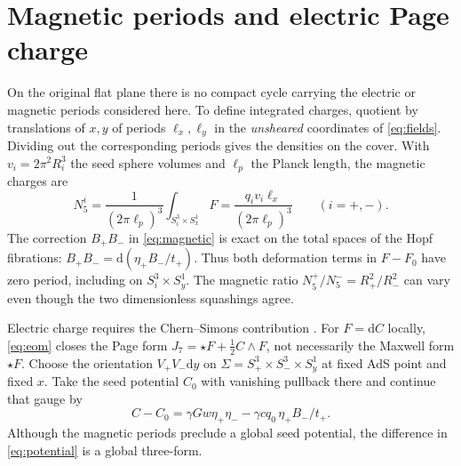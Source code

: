 \documentclass[11pt,a4paper]{article}
\numberwithin{equation}{section}
\newcommand{\dd}{\mathrm{d}}
\begin{document}
\section{Magnetic periods and electric Page charge}\label{sec:charges}

On the original flat plane there is no compact cycle carrying the electric or magnetic periods considered here. To define integrated charges, quotient by translations of $x,y$ of periods $\ell_x,\ell_y$ in the \emph{unsheared} coordinates of \eqref{eq:fields}. Dividing out the corresponding periods gives the densities on the cover. With $v_i=2\pi^2 R_i^3$ the seed sphere volumes and $\ell_p$ the Planck length, the magnetic charges are
\begin{equation}
 N_5^i=\frac{1}{(2\pi\ell_p)^3}\int_{S_i^3\times S_x^1}F
      =\frac{q_i v_i\ell_x}{(2\pi\ell_p)^3}\qquad(i=+,-).\label{eq:n5}
\end{equation}
The correction $B_+B_-$ in \eqref{eq:magnetic} is exact on the total spaces of the Hopf fibrations: $B_+B_-=\dd(\eta_+B_-/t_+)$. Thus both deformation terms in $F-F_0$ have zero period, including on $S_i^3\times S_y^1$. The magnetic ratio $N_5^+/N_5^-=R_+^2/R_-^2$ can vary even though the two dimensionless squashings agree.

Electric charge requires the Chern--Simons contribution \cite{Page,Marolf}. For $F=\dd C$ locally, \eqref{eq:eom} closes the Page form $J_7=\star F+\tfrac12 C\wedge F$, not necessarily the Maxwell form $\star F$. Choose the orientation $V_+V_-\dd y$ on $\Sigma=S_+^3\times S_-^3\times S_y^1$ at fixed AdS point and fixed $x$. Take the seed potential $C_0$ with vanishing pullback there and continue that gauge by
\begin{equation}
 C-C_0=\gamma G w\eta_+\eta_- -\gamma c q_0\,\eta_+B_-/t_+.\label{eq:potential}
\end{equation}
Although the magnetic periods preclude a global seed potential, the difference in \eqref{eq:potential} is a global three-form.
\end{document}
